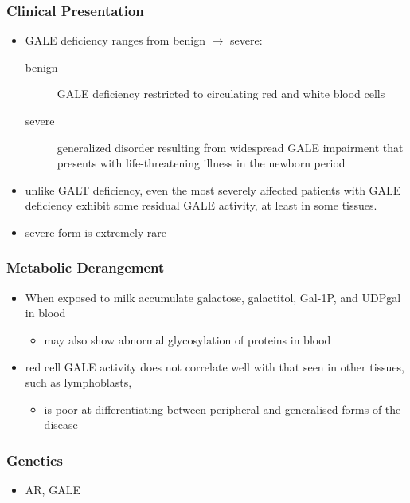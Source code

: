 \documentclass{scrartcl}
\begin{document}
\subsubsection{Clinical Presentation}
\label{sec:orga16cbed}
\begin{itemize}
\item GALE deficiency ranges from benign \(\to\) severe:
\begin{description}
\item[{benign}] GALE deficiency restricted to circulating red and white blood cells
\item[{severe}] generalized disorder resulting from widespread GALE
impairment that presents with life-threatening illness
in the newborn period
\end{description}

\item unlike GALT deficiency, even the most severely affected patients
with GALE deficiency exhibit some residual GALE activity, at least
in some tissues.
\item severe form is extremely rare
\end{itemize}

\subsubsection{Metabolic Derangement}
\label{sec:org9a0d2d7}
\begin{itemize}
\item When exposed to milk accumulate galactose, galactitol, Gal-1P, and
UDPgal in blood
\begin{itemize}
\item may also show abnormal glycosylation of proteins in blood
\end{itemize}
\item red cell GALE activity does not correlate well with that seen in
other tissues, such as lymphoblasts,
\begin{itemize}
\item is poor at differentiating between peripheral and generalised forms of the disease
\end{itemize}
\end{itemize}

\subsubsection{Genetics}
\label{sec:org07e6160}
\begin{itemize}
\item AR, GALE
\end{itemize}
\end{document}
